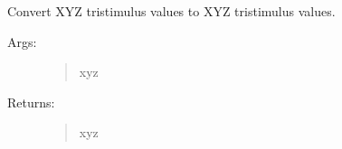 \documentclass[letterpaper,10pt,english]{sphinxmanual}
\begin{document}
\begin{fulllineitems}
\label{\detokenize{color:luxpy.color.ctf.colortransforms.xyz_to_xyz}}
Convert XYZ tristimulus values to XYZ tristimulus values.
\begin{description}
\item[{Args:}] \leavevmode\begin{quote}\begin{description}
\item[{xyz}] \leavevmode
{}

\end{description}\end{quote}

\item[{Returns:}] \leavevmode\begin{quote}\begin{description}
\item[{xyz}] \leavevmode
{}

\end{description}\end{quote}

\end{description}

\end{fulllineitems}

\end{document}
